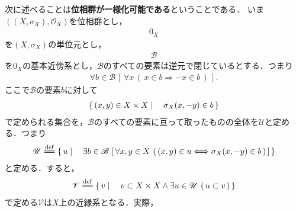 	次に述べることは{\bf 位相群が一様化可能である}ということである．
	いま$\left(\left(X,\sigma_X\right),\mathscr{O}_X\right)$を位相群とし，
	\begin{align}
		0_X
	\end{align}
	を$\left(X,\sigma_X\right)$の単位元とし，
	\begin{align}
		\mathscr{B}
	\end{align}
	を$0_X$の基本近傍系とし，$\mathscr{B}$のすべての要素は逆元で閉じているとする．つまり
	\begin{align}
		\forall b \in \mathscr{B}\, \left[\, \forall x\, (\, x \in b \Longrightarrow -x \in b\, )\, \right].
	\end{align}
	ここで$\mathscr{B}$の要素$b$に対して
	\begin{align}
		\left\{\, (x,y) \in X \times X \mid \quad \sigma_X(x,-y) \in b\, \right\}
	\end{align}
	で定められる集合を，$\mathscr{B}$のすべての要素に亘って取ったものの全体を$\mathscr{U}$と定める．つまり
	\begin{align}
		\mathscr{U} \defeq \Set{u}{\exists b \in \mathscr{B}\,
		\left[\, \forall x,y \in X\, \left(\, (x,y) \in u \Longleftrightarrow\sigma_X(x,-y) \in b\, \right)\, \right]}
	\end{align}
	と定める．すると，
	\begin{align}
		\mathscr{V} \defeq \Set{v}{v \subset X \times X \wedge \exists u \in \mathscr{U}\, \left(\, u \subset v\, \right)}
	\end{align}
	で定める$\mathscr{V}$は$X$上の近縁系となる．実際，
